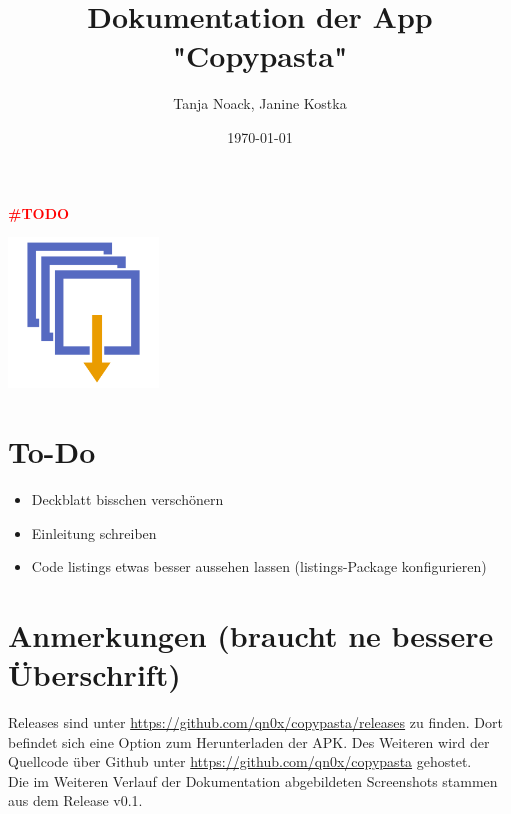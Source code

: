 \documentclass[11pt]{article}
\title{Dokumentation der App "Copypasta"}
\author{Tanja Noack, Janine Kostka}
\date{\today}
\begin{document}
	\begin{titlepage}
		\centering
		\maketitle
		\thispagestyle{empty}
		\textcolor{red}{\textbf{{\LARGE \#TODO}}}
		
		\vspace{2cm}
		\includegraphics[width=0.3\textwidth]{Konzepte/logo.png}\par\vspace{1cm}
		
		\vfill
	\end{titlepage}
	\pagebreak
	
	
	\tableofcontents
	\pagebreak
	
	
\section*{To-Do}
	\begin{itemize}
		\item Deckblatt bisschen verschönern
		\item Einleitung schreiben
		\item Code listings etwas besser aussehen lassen (listings-Package konfigurieren)
	\end{itemize}

\section*{Anmerkungen (braucht ne bessere Überschrift)}
	Releases sind unter \sloppy\url{https://github.com/qn0x/copypasta/releases} zu finden. Dort befindet sich eine Option zum Herunterladen der APK.  
	Des Weiteren wird der Quellcode über Github unter \sloppy\url{https://github.com/qn0x/copypasta} gehostet. \\
	Die im Weiteren Verlauf der Dokumentation abgebildeten Screenshots stammen aus dem Release v0.1.
\end{document}
